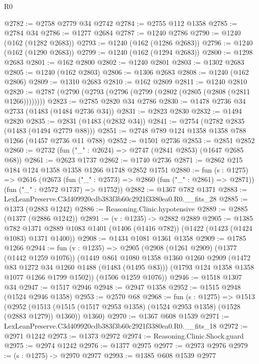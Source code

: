 \begin{lexlean}{R0}
\begin{coremodule}
@2782 := @2758 @2779 @34 @2742
@2784 := @2755 @112 @1358
@2785 := @2784 @34
@2786 := @1277 @2684
@2787 := @1240 @2786
@2790 := @1240 (@162 (@1282 @2683))
@2793 := @1240 (@162 (@1286 @2683))
@2796 := @1240 (@162 (@1290 @2683))
@2799 := @1240 (@162 (@1294 @2683))
@2800 := @1298 @2683
@2801 := @162 @2800
@2802 := @1240 @2801
@2803 := @1302 @2683
@2805 := @1240 (@162 @2803)
@2806 := @1306 @2683
@2808 := @1240 (@162 @2806)
@2809 := @1310 @2683
@2810 := @162 @2809
@2811 := @1240 @2810
@2820 := @2787 (@2790 (@2793 (@2796 (@2799 (@2802 (@2805 (@2808 (@2811 @1266))))))))
@2823 := @2785 @2820 @34 @2786
@2830 := @1478 @2736 @34 @2733 (@1483 (@1484 @2736 @34))
@2831 := @2823 @2830
@2832 := @1494 @2820
@2835 := @2831 (@1483 (@2832 @34))
@2841 := @2754 (@2782 @2835 (@1483 (@1494 @2779 @88)))
@2851 := @2748 @789 @124 @1358 @1358 @788 @1266 (@1457 @2736 @11 @788)
@2852 := @1501 @2736
@2853 := @2851 @2852
@2860 := @2732 (fun ("_" : @2624) => @2747 (@2841 @2853) (@1647 @2685 @68))
@2861 := @2623 @1737
@2862 := @1740 @2736
@2871 := @2862 @215 @184 @124 @1358 @1358 @1266 @1748 @2852 @1751
@2880 := fun (s : @1275) =>
  @2616
    (@2673
      (fun ("_" : @2573) => @2860 (fun ("_" : @2861) => @2871))
      (fun ("_" : @2572 @1737) => @1752))
@2882 := @1367 @782 @1371
@2883 := LexLeanPreserve.C3d409920cdb383f3b60c2921f3380ea0.R0.__fits_28
@2885 := @1373 (@2883 @1242)
@2886 := Reasoning.Clinic.hypotensive
@2889 := @2885 (@1377 (@2886 @1242))
@2891 := (v : @1235) -> @2882 @2889
@2905 := @1385
    @782
    @1371
    @2889
    @1083
    @1401
    (@1406 (@1416 @782))
    (@1422 (@1423 (@1424 @1083) @1371 @1400))
@2908 := @1434 @1081 @1361 @1358
@2909 := @1785 @1266
@2944 := fun (v : @1235) =>
  @2905
    (@2908
      (@1261 @2909)
      (@1377 (@1442 @1259 @1076))
      (@1449
        @861
        @1080
        @1358
        @1360
        @1260
        @2909
        (@1472 @83 @1272 @34 @1260 @1488 (@1483 (@1495 @83)))
        (@1793 @124 @1358 @1358 @1077 @1266 @1799 @1502))
      (@1506 @1259 @1076))
@2946 := @1518 @1307 @34
@2947 := @1517 @2946
@2948 := @2947 @1358
@2952 := @1515 @2948 (@1524 @2946 @1358)
@2953 := @2570 @68
@2968 := fun (s : @1275) =>
  @1513
    (@2952
      (@1513 (@1515 (@1517 @2953 @1358) (@1524 @2953 @1358) (@1528 (@2883 @1279)) @1360))
      @1360)
@2970 := @1367 @608 @1539
@2971 := LexLeanPreserve.C3d409920cdb383f3b60c2921f3380ea0.R0.__fits_18
@2972 := @2971 @1242
@2973 := @1373 @2972
@2974 := Reasoning.Clinic.Shock.guard
@2975 := @2974 @1242
@2976 := @1377 @2975
@2977 := @2973 @2976
@2979 := (s : @1275) -> @2970 @2977
@2993 := @1385
    @608
    @1539
    @2977

\end{coremodule}
\end{lexlean}
